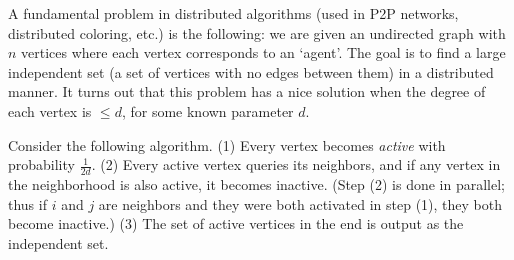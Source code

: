 \documentclass[addpoints]{exam}
\begin{document}
\begin{questions}
A fundamental problem in distributed algorithms (used in P2P networks, distributed coloring, etc.) is the following:  we are given an undirected graph with $n$ vertices where each vertex corresponds to an `agent'. The goal is to find a large independent set (a set of vertices with no edges between them) in a distributed manner. It turns out that this problem has a nice solution when the degree of each vertex is $\le d$, for some known parameter $d$.

Consider the following algorithm. (1) Every vertex becomes {\em active} with probability $\frac{1}{2d}$.  (2) Every active vertex queries its neighbors, and if any vertex in the neighborhood is also active, it becomes inactive. (Step (2) is done in parallel; thus if $i$ and $j$ are neighbors and they were both activated in step (1), they both become inactive.) (3) The set of active vertices in the end is output as the independent set.


\end{questions}
\end{document}
